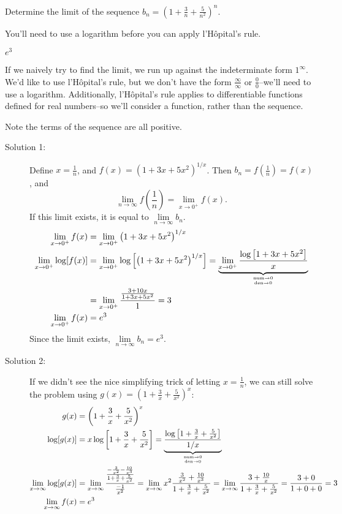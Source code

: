 \begin{question}
Determine the limit of the sequence $\displaystyle b_n=\left(1+\frac{3}{n}+\frac{5}{n^2}\right)^n$.
\end{question}
\begin{hint}
You'll need to use a logarithm before you can apply l'H\^{o}pital's rule.
\end{hint}
\begin{answer}
$e^3$
\end{answer}
\begin{solution}
If we naively try to find the limit, we run up against the indeterminate form $1^{\infty}$. We'd like to use l'H\^{o}pital's rule, but we don't have the form $\frac{\infty}{\infty}$ or $\frac{0}{0}$--we'll need to use a logarithm. Additionally, l'H\^{o}pital's rule applies to differentiable functions defined for real numbers--so we'll consider a function, rather than the sequence.

Note the terms of the sequence are all positive.

\begin{description}
\item[Solution 1:] Define $x=\frac{1}{n}$, and $f(x)=\left(1+3x+5x^2\right)^{1/x}$. Then $b_n=f\left(\frac{1}{n}\right)=f(x)$, and
 \[\lim_{n \to \infty} f\left(\frac{1}{n}\right) = \lim_{x \to 0^+}f(x).\]
 If this limit exists, it is equal to $\lim\limits_{n \to \infty}b_n$.
 \begin{align*}
  \lim_{x \to 0^+}f(x)&= \lim_{x \to 0^+} \left(1+3x+5x^2\right)^{1/x}\\
  \lim_{x \to 0^+}\log[f(x)]&= \lim_{x \to 0^+} \log\left[\left(1+3x+5x^2\right)^{1/x}\right]
  =\underbrace{ \lim_{x \to 0^+}\frac{ \log\left[1+3x+5x^2 \right]}{x}}_{\atp{\mathrm{num}\to 0}{\mathrm{den}\to0}}\\
  &=\lim_{x \to 0^+}\frac{\frac{3+10x}{1+3x+5x^2}}{1}=3\\
  \lim_{x \to 0^+}f(x)&=e^3
 \end{align*}
 Since the limit exists, $\lim\limits_{n \to \infty}b_n=e^3$.

 \item[Solution 2:]
 If we didn't see the nice simplifying trick of letting $x=\frac{1}{n}$, we can still solve the problem using $g(x)=\left(1+\frac{3}{x}+\frac{5}{x^2}\right)^{x}$:
\begin{align*}
g(x)&=\left(1+\frac{3}{x}+\frac{5}{x^2}\right)^x\\
\log [g(x)]&= x\log\left[1+\frac{3}{x}+\frac{5}{x^2}\right]
=\underbrace{\frac{\log\left[1+\frac{3}{x}+\frac{5}{x^2}\right]}{1/x}}_{\atp{\mathrm{num}\to 0}{\mathrm{den}\to0}}\\
\lim_{x \to \infty} \log[g(x)]&=\lim_{x \to \infty}\dfrac{\frac{-\frac{3}{x^2}-\frac{10}{x^3}}{1+\frac{3}{x}+\frac{5}{x^2}}}{\frac{-1}{x^2}}=
\lim_{x \to \infty}x^2\frac{\frac{3}{x^2}+\frac{10}{x^3}}{1+\frac{3}{x}+\frac{5}{x^2}}
=
\lim_{x \to \infty}\frac{3+\frac{10}{x}}{1+\frac{3}{x}+\frac{5}{x^2}} = \frac{3+0}{1+0+0}=3\\
\lim_{x \to \infty} f(x)&=e^3\end{align*}


\end{description}
\end{solution}
